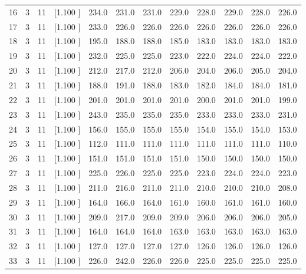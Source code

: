 \documentclass[12pt,a4paper]{article}
\begin{document}
\begin{center}
{\begin{tabular}{r r r r r r r r r r r r}
  16&  3& 11&[1.100     ]&   234.0&   231.0&   231.0&   229.0&   228.0&   229.0&   228.0&   226.0\\[-0.02in]
  17&  3& 11&[1.100     ]&   233.0&   226.0&   226.0&   226.0&   226.0&   226.0&   226.0&   226.0\\[-0.02in]
  18&  3& 11&[1.100     ]&   195.0&   188.0&   188.0&   185.0&   183.0&   183.0&   183.0&   183.0\\[-0.02in]
  19&  3& 11&[1.100     ]&   232.0&   225.0&   225.0&   223.0&   222.0&   224.0&   224.0&   222.0\\[-0.02in]
  20&  3& 11&[1.100     ]&   212.0&   217.0&   212.0&   206.0&   204.0&   206.0&   205.0&   204.0\\[-0.02in]
  21&  3& 11&[1.100     ]&   188.0&   191.0&   188.0&   183.0&   182.0&   184.0&   184.0&   181.0\\[-0.02in]
  22&  3& 11&[1.100     ]&   201.0&   201.0&   201.0&   201.0&   200.0&   201.0&   201.0&   199.0\\[-0.02in]
  23&  3& 11&[1.100     ]&   243.0&   235.0&   235.0&   235.0&   233.0&   233.0&   233.0&   231.0\\[-0.02in]
  24&  3& 11&[1.100     ]&   156.0&   155.0&   155.0&   155.0&   154.0&   155.0&   154.0&   153.0\\[-0.02in]
  25&  3& 11&[1.100     ]&   112.0&   111.0&   111.0&   111.0&   111.0&   111.0&   111.0&   110.0\\[-0.02in]
  26&  3& 11&[1.100     ]&   151.0&   151.0&   151.0&   151.0&   150.0&   150.0&   150.0&   150.0\\[-0.02in]
  27&  3& 11&[1.100     ]&   225.0&   226.0&   225.0&   225.0&   223.0&   224.0&   224.0&   223.0\\[-0.02in]
  28&  3& 11&[1.100     ]&   211.0&   216.0&   211.0&   211.0&   210.0&   210.0&   210.0&   208.0\\[-0.02in]
  29&  3& 11&[1.100     ]&   164.0&   166.0&   164.0&   161.0&   160.0&   161.0&   161.0&   160.0\\[-0.02in]
  30&  3& 11&[1.100     ]&   209.0&   217.0&   209.0&   209.0&   206.0&   206.0&   206.0&   205.0\\[-0.02in]
  31&  3& 11&[1.100     ]&   164.0&   164.0&   164.0&   163.0&   163.0&   163.0&   163.0&   163.0\\[-0.02in]
  32&  3& 11&[1.100     ]&   127.0&   127.0&   127.0&   127.0&   126.0&   126.0&   126.0&   126.0\\[-0.02in]
  33&  3& 11&[1.100     ]&   226.0&   242.0&   226.0&   226.0&   225.0&   225.0&   225.0&   225.0\\[-0.02in]

\end{tabular}}
\end{center}
\end{document}
